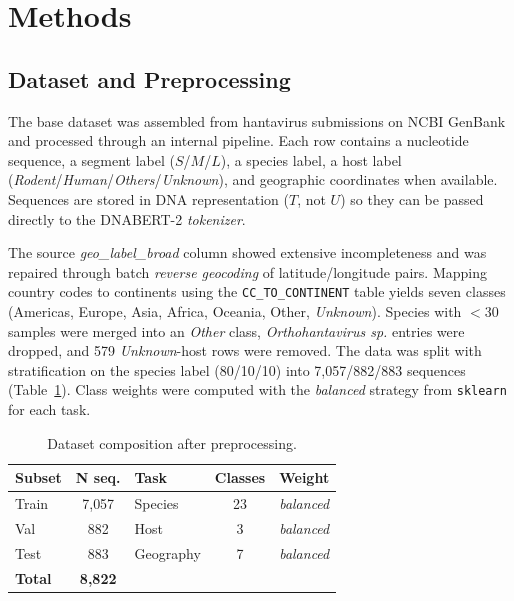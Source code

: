 \documentclass[conference]{IEEEtran}
\begin{document}
\section{Methods}\label{sec:method}

\subsection{Dataset and Preprocessing}

The base dataset was assembled from hantavirus submissions on NCBI
GenBank and processed through an internal pipeline. Each row contains a
nucleotide sequence, a segment label ($S$/$M$/$L$), a species label, a
host label (\emph{Rodent}/\emph{Human}/\emph{Others}/\emph{Unknown}), and
geographic coordinates when available. Sequences are stored in DNA
representation ($T$, not $U$) so they can be passed directly to the
DNABERT-2 \emph{tokenizer}.

The source \emph{geo\_label\_broad} column showed extensive
incompleteness and was repaired through batch \emph{reverse geocoding} of
latitude/longitude pairs. Mapping country codes to continents using the
\texttt{CC\_TO\_CONTINENT} table yields seven classes (Americas, Europe,
Asia, Africa, Oceania, Other, \emph{Unknown}). Species with $<\!30$
samples were merged into an \emph{Other} class, \emph{Orthohantavirus sp.}
entries were dropped, and 579 \emph{Unknown}-host rows were removed. The
data was split with stratification on the species label (80/10/10) into
7{,}057/882/883 sequences (Table~\ref{tab:dataset}). Class weights were
computed with the \emph{balanced} strategy from \texttt{sklearn} for each
task.

\begin{table}[t]
\centering
\caption{Dataset composition after preprocessing.}
\label{tab:dataset}
\begin{tabular}{lc|lcc}
\toprule
\textbf{Subset} & \textbf{N seq.} &
\textbf{Task} & \textbf{Classes} & \textbf{Weight} \\
\midrule
Train & 7{,}057 & Species   & 23 & \emph{balanced} \\
Val   & 882     & Host      & 3  & \emph{balanced} \\
Test  & 883     & Geography & 7  & \emph{balanced} \\
\midrule
\textbf{Total} & \textbf{8{,}822} & & & \\
\bottomrule
\end{tabular}
\end{table}
\end{document}
